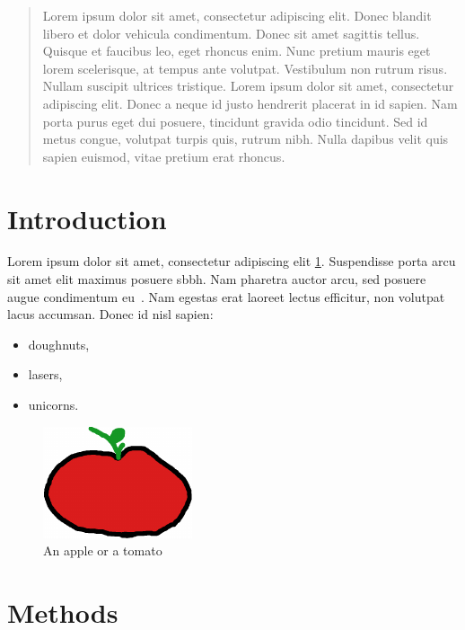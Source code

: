 \documentclass[12pt]{article}
\begin{document}
\maketitle

\begin{abstract}
  Lorem ipsum dolor sit amet, consectetur adipiscing elit. Donec blandit libero et dolor vehicula condimentum. Donec sit amet sagittis tellus. Quisque et faucibus leo, eget rhoncus enim. Nunc pretium mauris eget lorem scelerisque, at tempus ante volutpat. Vestibulum non rutrum risus. Nullam suscipit ultrices tristique. Lorem ipsum dolor sit amet, consectetur adipiscing elit. Donec a neque id justo hendrerit placerat in id sapien. Nam porta purus eget dui posuere, tincidunt gravida odio tincidunt. Sed id metus congue, volutpat turpis quis, rutrum nibh. Nulla dapibus velit quis sapien euismod, vitae pretium erat rhoncus.
\end{abstract}

\clearpage
\section{Introduction}

Lorem ipsum dolor sit amet, consectetur adipiscing elit \cref{fig:applemato}. Suspendisse porta arcu sit amet elit maximus posuere \gls{sbbh}. Nam pharetra auctor arcu, sed posuere augue condimentum eu~\autocite{Capek2004}. Nam egestas erat laoreet lectus efficitur, non volutpat lacus accumsan. Donec id nisl sapien:
%
\begin{itemize}
  \item doughnuts,
  \item lasers,
  \item unicorns.
\end{itemize}

\begin{figure}
	\centering
	\includegraphics{applemato}
	\caption{An apple or a tomato}%
	\label{fig:applemato}
\end{figure}

\section{Methods}
\end{document}
